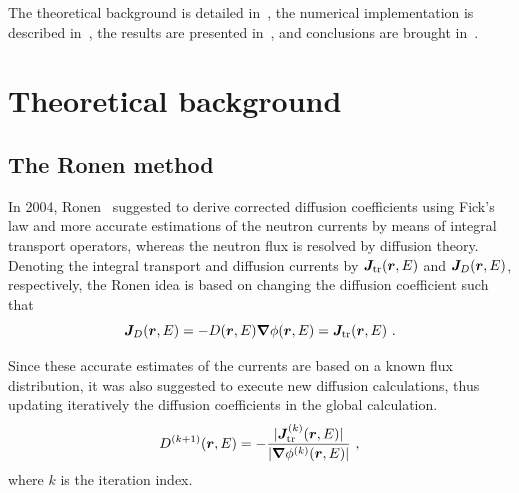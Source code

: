 
The theoretical background is detailed in~, the numerical implementation is described in~, the results are presented in~, and conclusions are brought in~.

%
\section{Theoretical background}
\label{sec:theory}

%
\subsection{The Ronen method}
\label{sec:RM}

In 2004, Ronen~\cite{Ronen-2004} suggested to derive corrected diffusion coefficients using Fick's law and more accurate estimations of the neutron currents by means of integral transport operators, whereas the neutron flux is resolved by diffusion theory. Denoting the integral transport and diffusion currents by $\bm{J}_{\textrm{\scriptsize{tr}}}(\bm{r},E)$ and $\bm{J}_D(\bm{r},E)$, respectively, the Ronen idea is based on changing the diffusion coefficient such that
\begin{equation}\label{eq:Fick}
\bm{J}_D(\bm{r},E) = -D(\bm{r},E)\bm{\nabla}\phi(\bm{r},E) = \bm{J}_{\textrm{\scriptsize{tr}}}(\bm{r},E) \,\, . 
\end{equation}

Since these accurate estimates of the currents are based on a known flux distribution, it was also suggested to execute new diffusion calculations, thus updating iteratively the diffusion coefficients in the global calculation. 
\begin{equation}\label{eq:RM-it}
D^{(k+1)}(\bm{r},E) = -\frac{\lvert\bm{J}_{\textrm{\scriptsize{tr}}}^{(k)}(\bm{r},E)\rvert}{\lvert\bm{\nabla}\phi^{(k)}(\bm{r},E)\rvert} \,\, ,
\end{equation}
where $k$ is the iteration index. 

